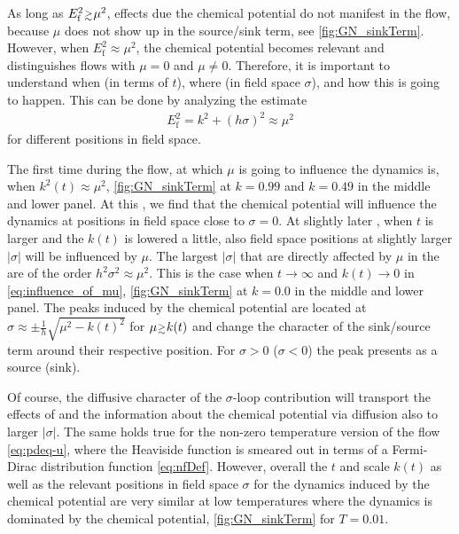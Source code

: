 As long as $E^2_\mathrm{f} \smallergtrsim \mu^2$, effects due the chemical potential do not manifest in the \frg{} flow, because $\mu$ does not show up in the source/sink term, see \cref{fig:GN_sinkTerm}.
However, when $E_\mathrm{f}^2 \approx \mu^2$, the chemical potential becomes relevant and distinguishes \frg{} flows with $\mu = 0$ and $\mu \neq 0$.
Therefore, it is important to understand when (in terms of \rgtime{} $t$), where (in field space $\sigma$), and how this is going to happen.
This can be done by analyzing the estimate
\begin{align}
	E_\mathrm{f}^2 = k^2 + ( h \sigma )^2 \approx \mu^2	\label{eq:influence_of_mu}
\end{align}
for different positions in field space.
	
The first time during the \frg{} flow, at which $\mu$ is going to influence the dynamics is, when $k^2 ( t ) \approx \mu^2$, \cf{} \cref{fig:GN_sinkTerm} at $k=0.99$ and $k=0.49$ in the middle and lower panel.
At this \rgscale{}, we find that the chemical potential will influence the dynamics at positions in field space close to $\sigma = 0$.
At slightly later \rgtimes{}, when $t$ is larger and the \rgscale{} $k ( t )$ is lowered a little, also field space positions at slightly larger $| \sigma |$ will be influenced by $\mu$.
The largest $| \sigma |$ that are directly affected by $\mu$ in the \pde{} are of the order $h^2 \sigma^2 \approx \mu^2$.
This is the case when $t \rightarrow \infty$ and $k ( t ) \rightarrow 0$ in \cref{eq:influence_of_mu}, \cf{} \cref{fig:GN_sinkTerm} at $k=0.0$ in the middle and lower panel.
The peaks induced by the chemical potential are located at ${\sigma\approx\pm \tfrac{1}{h}\sqrt{\mu^2-k(t)^2}}$ for $\mu \smallergtrsim k(t)$ and change the character of the sink/source term around their respective position.
For $\sigma>0$ ($\sigma<0$) the peak presents as a source (sink).
	 
Of course, the diffusive character of the $\sigma$-loop contribution will transport the effects of and the information about the chemical potential via diffusion also to larger $| \sigma |$.
The same holds true for the non-zero temperature version of the \frg{} flow \cref{eq:pdeq-u}, where the Heaviside function is smeared out in terms of a Fermi-Dirac distribution function \eqref{eq:nfDef}.
However, overall the \rgtime{} $t$ and scale $k ( t )$ as well as the relevant positions in field space $\sigma$ for the dynamics induced by the chemical potential are very similar at low temperatures where the dynamics is dominated by the chemical potential, \cf{} \cref{fig:GN_sinkTerm} for $T=0.01$.
	
